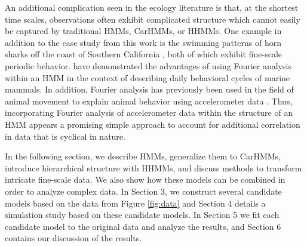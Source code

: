 An additional complication seen in the ecology literature is that, at the shortest time scales, observations often exhibit complicated structure which cannot easily be captured by traditional HMMs, CarHMMs, or HHMMs. One example in addition to the case study from this work is the swimming patterns of horn sharks off the coast of Southern California \citep{Adam:2019}, both of which exhibit fine-scale periodic behavior. 
\cite{Heerah:2017} have demonstrated the advantages of using Fourier analysis within an HMM in the context of describing daily behavioral cycles of marine mammals.
In addition, Fourier analysis has previously been used in the field of animal movement to explain animal behavior using accelerometer data \citep{Fehlmann:2017,Shorter:2017}.
Thus, incorporating Fourier analysis of accelerometer data within the structure of an HMM appears a promising simple approach to account for additional correlation in data that is cyclical in nature.


In the following section, we describe HMMs, generalize them to CarHMMs, introduce hierarchical structure with HHMMs, and discuss methods to transform intricate fine-scale data. We also show how these models can be combined in order to analyze complex data. In Section 3, we construct several candidate models based on the data from Figure \ref{fig:data} and Section 4 details a simulation study based on these candidate models. In Section 5 we fit each candidate model to the original data and analyze the results, and Section 6 contains our discussion of the results.